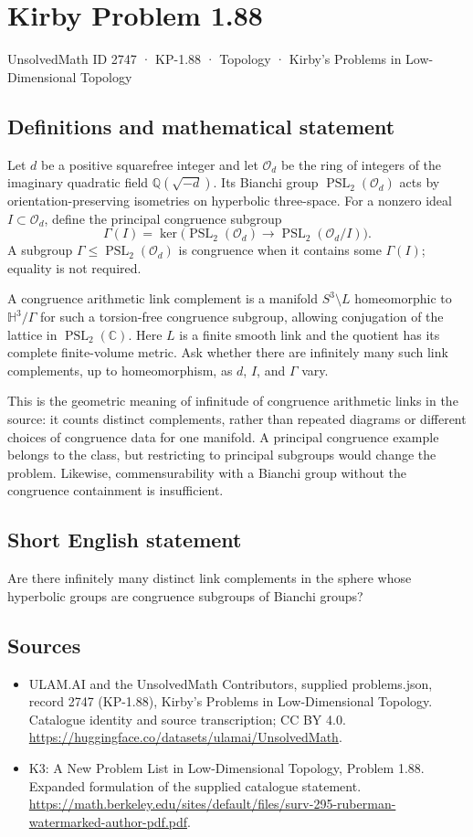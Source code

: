 \documentclass[11pt,a4paper]{article}
\begin{document}
\section*{Kirby Problem 1.88}\label{2747}
{\small UnsolvedMath ID 2747 · KP-1.88 · Topology · Kirby's Problems in Low-Dimensional Topology}
\subsection{Definitions and mathematical statement}
Let $d$ be a positive squarefree integer and let $\mathcal O_d$ be the ring of integers of the imaginary quadratic field $\mathbb Q(\sqrt{-d})$. Its Bianchi group $\operatorname{PSL}_2(\mathcal O_d)$ acts by orientation-preserving isometries on hyperbolic three-space. For a nonzero ideal $I\subset\mathcal O_d$, define the principal congruence subgroup
\[
\Gamma(I)=\ker\bigl(\operatorname{PSL}_2(\mathcal O_d)
\longrightarrow\operatorname{PSL}_2(\mathcal O_d/I)\bigr).
\]
A subgroup $\Gamma\le\operatorname{PSL}_2(\mathcal O_d)$ is congruence when it contains some $\Gamma(I)$; equality is not required.

A congruence arithmetic link complement is a manifold $S^3\setminus L$ homeomorphic to $\mathbb H^3/\Gamma$ for such a torsion-free congruence subgroup, allowing conjugation of the lattice in $\operatorname{PSL}_2(\mathbb C)$. Here $L$ is a finite smooth link and the quotient has its complete finite-volume metric. Ask whether there are infinitely many such link complements, up to homeomorphism, as $d$, $I$, and $\Gamma$ vary.

This is the geometric meaning of infinitude of congruence arithmetic links in the source: it counts distinct complements, rather than repeated diagrams or different choices of congruence data for one manifold. A principal congruence example belongs to the class, but restricting to principal subgroups would change the problem. Likewise, commensurability with a Bianchi group without the congruence containment is insufficient.
\subsection{Short English statement}
Are there infinitely many distinct link complements in the sphere whose hyperbolic groups are congruence subgroups of Bianchi groups?
\subsection{Sources}
\begin{itemize}
\item[S1] ULAM.AI and the UnsolvedMath Contributors, supplied problems.json, record 2747 (KP-1.88), Kirby's Problems in Low-Dimensional Topology. Catalogue identity and source transcription; CC BY 4.0.
\url{https://huggingface.co/datasets/ulamai/UnsolvedMath}.
\item[S2] K3: A New Problem List in Low-Dimensional Topology, Problem 1.88. Expanded formulation of the supplied catalogue statement.
\url{https://math.berkeley.edu/sites/default/files/surv-295-ruberman-watermarked-author-pdf.pdf}.
\end{itemize}
\end{document}
